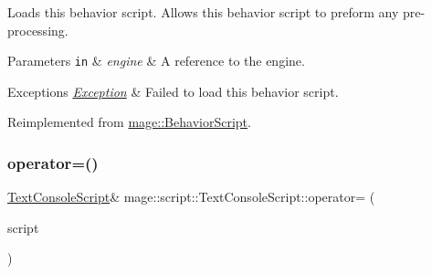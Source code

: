Loads this behavior script. Allows this behavior script to preform any pre-\/processing.


\begin{DoxyParams}[1]{Parameters}
\mbox{\tt in}  & {\em engine} & A reference to the engine. \\
\hline
\end{DoxyParams}

\begin{DoxyExceptions}{Exceptions}
{\em \mbox{\hyperlink{classmage_1_1_exception}{Exception}}} & Failed to load this behavior script. \\
\hline
\end{DoxyExceptions}


Reimplemented from \mbox{\hyperlink{classmage_1_1_behavior_script_ae7864876b2ffb1d1d8d8a56e3099f1f2}{mage\+::\+Behavior\+Script}}.

\mbox{\label{classmage_1_1script_1_1_text_console_script_a68af2a144f641c9813b333544fe3562a}} 
\subsubsection{\texorpdfstring{operator=()}{operator=()}\hspace{0.1cm}{\footnotesize\ttfamily [1/2]}}
{\footnotesize\ttfamily \mbox{\hyperlink{classmage_1_1script_1_1_text_console_script}{Text\+Console\+Script}}\& mage\+::script\+::\+Text\+Console\+Script\+::operator= (\begin{DoxyParamCaption}\item[{const \mbox{\hyperlink{classmage_1_1script_1_1_text_console_script}{Text\+Console\+Script}} \&}]{script }\end{DoxyParamCaption})\hspace{0.3cm}{\ttfamily [delete]}}

\mbox{\label{classmage_1_1script_1_1_text_console_script_ae8560dece8d507ee338dda68e3176fed}} 
